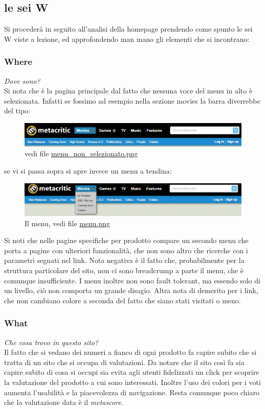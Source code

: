 \documentclass[12pt]{article}
\begin{document}
\subsection{le sei W}
Si procederà in seguito all'analisi della homepage prendendo come spunto le sei W viste a lezione, ed approfondendo man mano gli elementi che si incontrano:

\subsubsection{Where}
\textit{Dove sono?}\\
Si nota che è la pagina principale dal fatto che nessuna voce del menu in alto è selezionata.
Infatti se fossimo ad esempio nella sezione movies la barra diverrebbe del tipo:
\begin{figure}[H]
	\begin{center}
		\includegraphics[width=13.5cm]{menu_non_selezionato.png}
		\caption{vedi file \href{menu_non_selezionato.png}{menu\_non\_selezionato.png}}
	\end{center}
\end{figure}
se vi si passa sopra si apre invece un menu a tendina:
\begin{figure}[H]
	\begin{center}
		\includegraphics[width=13.5cm]{menu.png}
		\caption{Il menu, vedi file \href{menu.png}{menu.png}}
	\end{center}
\end{figure}
Si noti che nelle pagine specifiche per prodotto compare un secondo menu che porta a pagine con ulteriori funzionalità, che non sono altro che ricerche con i parametri segnati nel link.
Nota negativa è il fatto che, probabilmente per la struttura particolare del sito, non ci sono breadcrump a parte il menu, che è comunque insufficiente. I menu inoltre non sono fault tolerant, ma essendo solo di un livello, ciò non comporta un grande disagio.
Altra nota di demerito per i link, che non cambiano colore a seconda del fatto che siano stati visitati o meno.
\subsubsection{What}
\textit{Che cosa trovo in questo sito?}\\
Il fatto che si vedano dei numeri a fianco di ogni prodotto fa capire subito che si tratta di un sito che si occupa di valutazioni. Da notare che il sito così fa sia capire subito di cosa si occupi sia evita agli utenti fidelizzati un click per scoprire la valutazione del prodotto a cui sono interessati. Inoltre l'uso dei colori per i voti aumenta l'usabilità e la piacevolezza di navigazione. Resta comunque poco chiaro che la valutazione data è il \textit{metascore}.
\end{document}
